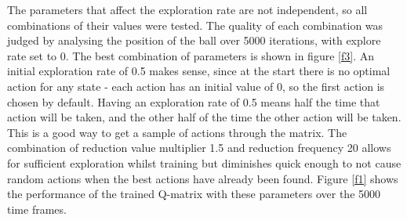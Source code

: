 \documentclass[12pt,a4paper]{article}
\begin{document}
The parameters that affect the exploration rate are not independent, so all combinations of their values were tested. The quality of each combination was judged by analysing the position of the ball over 5000 iterations, with explore rate set to 0. The best combination of parameters is shown in figure \ref{f3}. An initial exploration rate of 0.5 makes sense, since at the start there is no optimal action for any state - each action has an initial value of 0, so the first action is chosen by default. Having an exploration rate of 0.5 means half the time that action will be taken, and the other half of the time the other action will be taken. This is a good way to get a sample of actions through the matrix. The combination of reduction value multiplier 1.5 and reduction frequency 20 allows for sufficient exploration whilst training but diminishes quick enough to not cause random actions when the best actions have already been found. Figure \ref{f1} shows the performance of the trained Q-matrix with these parameters over the 5000 time frames.
\end{document}
